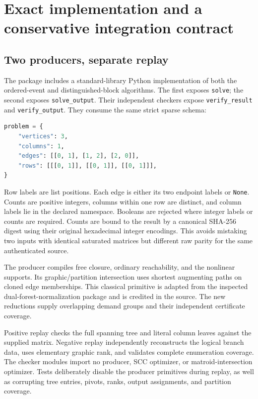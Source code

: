 \section{Exact implementation and a conservative integration contract}
\label{sec:implementation}

\subsection{Two producers, separate replay}

The package includes a standard-library Python implementation of both
the ordered-event and distinguished-block algorithms. The first exposes
\texttt{solve}; the second exposes \texttt{solve\_output}. Their independent
checkers expose \texttt{verify\_result} and \texttt{verify\_output}.
They consume the same strict sparse schema:
\begin{lstlisting}[language=Python]
problem = {
    "vertices": 3,
    "columns": 1,
    "edges": [[0, 1], [1, 2], [2, 0]],
    "rows": [[[0, 1]], [[0, 1]], [[0, 1]]],
}
\end{lstlisting}
Row labels are list positions. Each edge is either its two endpoint labels
or \texttt{None}. Counts are positive integers, columns within one row are
distinct, and column labels lie in the declared namespace. Booleans are
rejected where integer labels or counts are required. Counts are bound to
the result by a canonical SHA-256 digest using their original hexadecimal
integer encodings. This avoids mistaking two inputs with identical saturated
matrices but different raw parity for the same authenticated source.

The producer compiles free closure, ordinary reachability, and the
nonlinear supports. Its graphic/partition intersection uses shortest
augmenting paths on cloned edge memberships. This classical primitive is
adapted from the inspected dual-forest-normalization package and is credited
in the source. The new reductions supply overlapping demand groups and
their independent certificate coverage.

Positive replay checks the full spanning tree and literal column leaves
against the supplied matrix. Negative replay independently reconstructs
the logical branch data, uses elementary graphic rank, and validates
complete enumeration coverage. The checker modules import no producer,
SCC optimizer, or matroid-intersection optimizer. Tests deliberately disable
the producer primitives during replay, as well as corrupting tree entries,
pivots, ranks, output assignments, and partition coverage.


